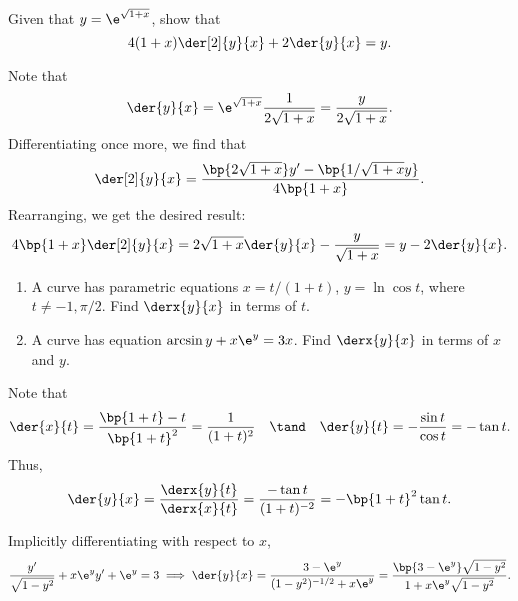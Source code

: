 \begin{problem}
    Given that $y = \e^{\sqrt{1 + x}}$, show that \[4(1 + x) \der[2]{y}{x} + 2\der{y}{x} = y.\]
\end{problem}
\begin{solution}
    Note that \[\der{y}{x} = \e^{\sqrt{1 + x}} \frac1{2\sqrt{1 + x}} = \frac{y}{2\sqrt{1 + x}}.\] Differentiating once more, we find that \[\der[2]{y}{x} = \frac{\bp{2\sqrt{1 + x}}y' - \bp{1/\sqrt{1 + x} y}}{4\bp{1 + x}}.\] Rearranging, we get the desired result: \[4\bp{1 + x} \der[2]{y}{x} = 2\sqrt{1 + x} \der{y}{x} - \frac{y}{\sqrt{1 + x}} = y - 2\der{y}{x}.\]
\end{solution}

\begin{problem}
    \begin{enumerate}
        \item A curve has parametric equations $x = t/(1+t)$, $y = \ln \cos t$, where $t \neq -1, \pi/2$. Find $\derx{y}{x}$ in terms of $t$.
        \item A curve has equation $\arcsin y + x\e^y = 3x$. Find $\derx{y}{x}$ in terms of $x$ and $y$.
    \end{enumerate}
\end{problem}
\begin{solution}
    \begin{ppart}
        Note that \[\der{x}{t} = \frac{\bp{1 + t} - t}{\bp{1 + t}^2} = \frac1{(1 + t)^2} \quad \tand \quad \der{y}{t} = -\frac{\sin t}{\cos t} = -\tan t.\] Thus, \[\der{y}{x} = \frac{\derx{y}{t}}{\derx{x}{t}} = \frac{-\tan t}{(1+t)^{-2}} = -\bp{1 + t}^2 \tan t.\]
    \end{ppart}
    \begin{ppart}
        Implicitly differentiating with respect to $x$, \[\frac{y'}{\sqrt{1 - y^2}} + x \e^y y' + \e^y = 3 \implies \der{y}{x} = \frac{3 - \e^y}{(1 - y^2)^{-1/2} + x\e^y} = \frac{\bp{3 - \e^y} \sqrt{1 - y^2}}{1 + x\e^y \sqrt{1 - y^2}}.\]
    \end{ppart}
\end{solution}

